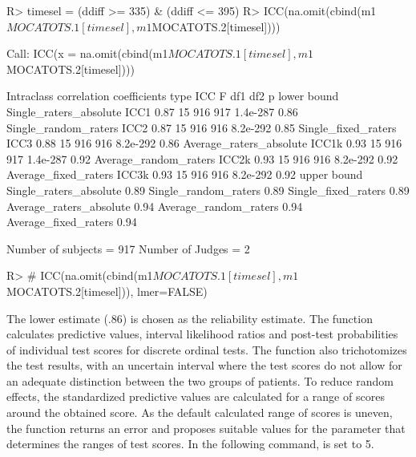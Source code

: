 \documentclass[
  nojss]{jss}
\begin{document}
\begin{CodeChunk}

\begin{CodeInput}
R> timesel = (ddiff >= 335) & (ddiff <= 395)
R> ICC(na.omit(cbind(m1$MOCATOTS.1[timesel], m1$MOCATOTS.2[timesel])))
\end{CodeInput}

\begin{CodeOutput}
Call: ICC(x = na.omit(cbind(m1$MOCATOTS.1[timesel], m1$MOCATOTS.2[timesel])))

Intraclass correlation coefficients 
                         type  ICC  F df1 df2        p lower bound
Single_raters_absolute   ICC1 0.87 15 916 917 1.4e-287        0.86
Single_random_raters     ICC2 0.87 15 916 916 8.2e-292        0.85
Single_fixed_raters      ICC3 0.88 15 916 916 8.2e-292        0.86
Average_raters_absolute ICC1k 0.93 15 916 917 1.4e-287        0.92
Average_random_raters   ICC2k 0.93 15 916 916 8.2e-292        0.92
Average_fixed_raters    ICC3k 0.93 15 916 916 8.2e-292        0.92
                        upper bound
Single_raters_absolute         0.89
Single_random_raters           0.89
Single_fixed_raters            0.89
Average_raters_absolute        0.94
Average_random_raters          0.94
Average_fixed_raters           0.94

 Number of subjects = 917     Number of Judges =  2
\end{CodeOutput}

\begin{CodeInput}
R> # ICC(na.omit(cbind(m1$MOCATOTS.1[timesel], m1$MOCATOTS.2[timesel])), lmer=FALSE)
\end{CodeInput}
\end{CodeChunk}

The lower estimate (.86) is chosen as the reliability estimate. The
 function calculates predictive values, interval likelihood
ratios and post-test probabilities of individual test scores for
discrete ordinal tests. The function also trichotomizes the test
results, with an uncertain interval where the test scores do not allow
for an adequate distinction between the two groups of patients. To
reduce random effects, the standardized predictive values are calculated
for a range of scores around the obtained score. As the default
calculated range of scores is uneven, the function returns an error and
proposes suitable values for the parameter  that
determines the ranges of test scores. In the following command,
 is set to 5.
\end{document}
